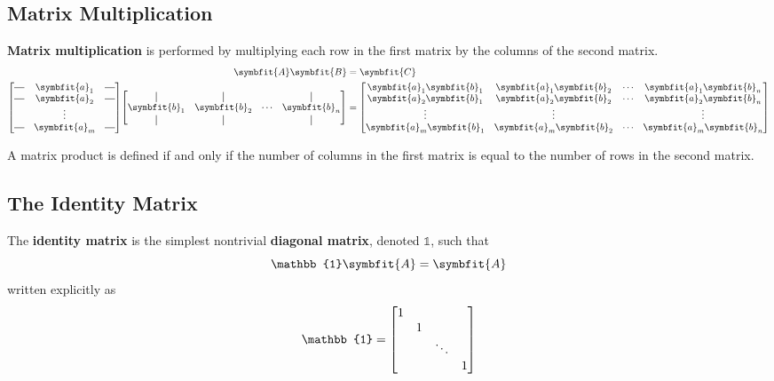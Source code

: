 \documentclass{article}
\begin{document}
	\subsection{Matrix Multiplication}	
	\begin{definition}
		\textbf{Matrix multiplication} is performed by multiplying each row in the first matrix by the columns of the second matrix.
 		\begin{align*}
			\symbfit{A} \symbfit{B} &= \symbfit{C} \\
			\mqty[
				\horzbar & \symbfit{a}_{1}  & \horzbar \\
				\horzbar & \symbfit{a}_{2}  & \horzbar \\
				         & \vdots           & \\
				\horzbar & \symbfit{a}_{m}  & \horzbar 
			]
			\mqty[
				\vertbar        & \vertbar        &         & \vertbar \\
				\symbfit{b}_{1} & \symbfit{b}_{2} & \cdots  & \symbfit{b}_{n} \\
				\vertbar        & \vertbar        &         & \vertbar
			] &=
			\mqty[
				\symbfit{a}_1\symbfit{b}_1 & \symbfit{a}_1\symbfit{b}_2 & \cdots & \symbfit{a}_1\symbfit{b}_n \\
				\symbfit{a}_2\symbfit{b}_1 & \symbfit{a}_2\symbfit{b}_2 & \cdots & \symbfit{a}_2\symbfit{b}_n \\
				\vdots                     & \vdots                     &        & \vdots \\
				\symbfit{a}_m\symbfit{b}_1 & \symbfit{a}_m\symbfit{b}_2 & \cdots & \symbfit{a}_m\symbfit{b}_n
			]
		\end{align*}
	\end{definition}
	\begin{theorem}
		A matrix product is defined if and only if the number of columns in the first matrix is equal to the number of rows in the second matrix.
	\end{theorem}
	\subsection{The Identity Matrix}
	\begin{definition}
		The \textbf{identity matrix} is the simplest nontrivial \textbf{diagonal matrix}, denoted $\mathbb{1}$, such that
		\begin{equation*}
			\mathbb{1} \symbfit{A} = \symbfit{A} 
		\end{equation*}
		written explicitly as
		\begin{equation*}
			\mathbb{1} = \mqty[
				1 &   &        & \\
			      & 1 &        & \\
				  &   & \ddots & \\
				  &   &        & 1
			]
		\end{equation*}
	\end{definition}
\end{document}
